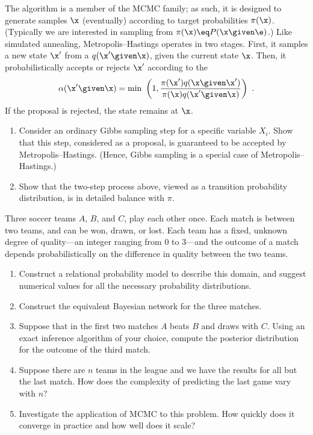 \begin{exercise}[MH-exercise]
The  algorithm is a member of the MCMC family; as such, it is designed to generate samples \(\x\) (eventually) according to target probabilities \(\pi(\x)\). (Typically we are interested in sampling from \(\pi(\x)\eq P(\x\given \e)\).)
Like simulated annealing, Metropolis--Hastings operates in two stages. First,
it samples a new state \(\x'\) from a  \(q(\x'\given \x)\), given the current state \(\x\). Then, it probabilistically accepts or rejects \(\x'\) according to
the 
\[
   \alpha(\x'\given \x) = \min\ \left(1,\frac{\pi(\x')q(\x\given \x')}{\pi(\x)q(\x'\given \x)}  \right)\ .
\]
If the proposal is rejected, the state remains at \(\x\).
\begin{enumerate}
\item Consider an ordinary Gibbs sampling step for a specific variable \(X_i\). Show that this step, considered as a proposal, is guaranteed to be accepted by Metropolis--Hastings.
(Hence, Gibbs sampling is a special case of Metropolis--Hastings.)
\item Show that the two-step process above, viewed as a transition probability distribution, is in detailed balance with \(\pi\).
\end{enumerate}
\end{exercise} 



\begin{exercise}\prgex%
Three soccer teams \(A\), \(B\), and \(C\), play each other once. Each match
is between two teams, and can be won, drawn, or lost. Each team has a
fixed, unknown degree of quality---an integer ranging from 0 to
3---and the outcome of a match depends probabilistically on the
difference in quality between the two teams.
\begin{enumerate}
\item Construct a relational probability model to describe this
domain, and suggest numerical values for
all the necessary probability distributions.
\item Construct the equivalent Bayesian network for the three matches.
\item Suppose that in the first two matches \(A\) beats \(B\) and draws with \(C\).
Using an exact inference algorithm of your choice, compute the posterior
distribution for the outcome of the third match.
\item Suppose there are \(n\) teams in the league and we have the results
for all but the last match. How does the complexity of predicting
the last game vary with \(n\)?
\item Investigate the application of MCMC to this problem. How quickly
does it converge in practice and how well does it scale?
\end{enumerate}
\end{exercise} 




